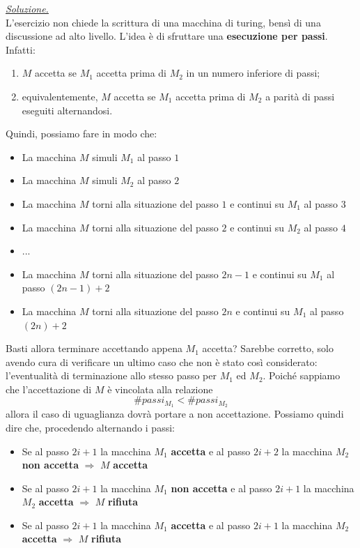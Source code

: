 \documentclass[a4paper,10pt]{article}
\begin{document}
{\begin{itemize}[label=, leftmargin=0pt]
    \begin{osservazioni}
    \underline{\textit{Soluzione.}}\\
    L'esercizio non chiede la scrittura di una macchina di turing, bensì di una discussione ad alto livello. L'idea è di sfruttare una \textbf{esecuzione per passi}. Infatti:
    \begin{enumerate}
        \item $M$ accetta se $M_1$ accetta prima di $M_2$ in un numero inferiore di passi;
        \item equivalentemente, $M$ accetta se $M_1$ accetta prima di $M_2$ a parità di passi eseguiti alternandosi.
    \end{enumerate}
    Quindi, possiamo fare in modo che:
    \begin{itemize}
        \item La macchina $M$ simuli $M_1$ al passo $1$
        \item La macchina $M$ simuli $M_2$ al passo $2$
        \item La macchina $M$ torni alla situazione del passo $1$ e continui su $M_1$ al passo $3$
        \item La macchina $M$ torni alla situazione del passo $2$ e continui su $M_2$ al passo $4$
        \item ...
        \item La macchina $M$ torni alla situazione del passo $2n-1$ e continui su $M_1$ al passo $(2n-1)+2$ 
        \item La macchina $M$ torni alla situazione del passo $2n$ e continui su $M_1$ al passo $(2n)+2$ 
    \end{itemize}
    Basti allora terminare accettando appena $M_1$ accetta? Sarebbe corretto, solo avendo cura di verificare un ultimo caso che non è stato così considerato: l'eventualità di terminazione allo stesso passo per $M_1$ ed $M_2$. Poiché sappiamo che l'accettazione di $M$ è vincolata alla relazione $$\#passi_{M_1} < \#passi_{M_2}$$allora il caso di uguaglianza dovrà portare a non accettazione.
    Possiamo quindi dire che, procedendo alternando i passi:
    \begin{itemize}
        \item Se al passo $2i+1$ la macchina $M_1$ \textbf{accetta} e al passo $2i+2$ la macchina $M_2$ \textbf{non accetta} $\Rightarrow$ $M$ \textbf{accetta}
        \item Se al passo $2i+1$ la macchina $M_1$ \textbf{non accetta} e al passo $2i+1$ la macchina $M_2$ \textbf{accetta} $\Rightarrow$ $M$ \textbf{rifiuta}
        \item Se al passo $2i+1$ la macchina $M_1$ \textbf{accetta} e al passo $2i+1$ la macchina $M_2$ \textbf{accetta} $\Rightarrow$ $M$ \textbf{rifiuta}
    \end{itemize}
    

\end{osservazioni}
\end{itemize}}
\end{document}
